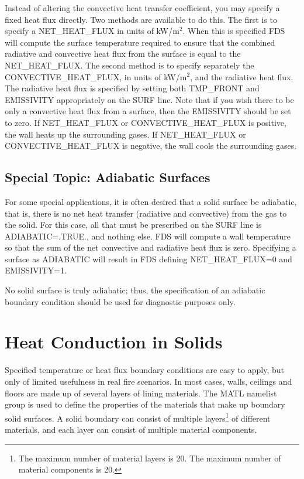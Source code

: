 \documentclass[11pt]{book}
\begin{document}
Instead of altering the convective heat transfer coefficient, you may specify a fixed heat flux directly.  Two methods are available to do this.  The first is to specify a {\ct NET\_HEAT\_FLUX} in units of kW/m$^2$.  When this is specified FDS will compute the surface temperature required to ensure that the combined radiative and convective heat flux from the surface is equal to the {\ct NET\_HEAT\_FLUX}.  The second method is to specify separately the {\ct CONVECTIVE\_HEAT\_FLUX}, in units of kW/m$^2$, and the radiative heat flux.  The radiative heat flux is specified  by setting both {\ct TMP\_FRONT} and {\ct EMISSIVITY} appropriately on the {\ct SURF} line. Note that if you wish there to be only a convective heat flux from a surface, then the {\ct EMISSIVITY} should be set to zero.  If {\ct NET\_HEAT\_FLUX} or {\ct CONVECTIVE\_HEAT\_FLUX} is positive, the wall heats up the surrounding gases. If {\ct NET\_HEAT\_FLUX} or {\ct CONVECTIVE\_HEAT\_FLUX} is negative, the wall cools the surrounding gases.



\subsection{Special Topic: Adiabatic Surfaces}
\label{info:adiabatic}

For some special applications, it is often desired that a solid surface be adiabatic, that is, there is no net heat transfer (radiative and convective) from the gas to the solid. For this case, all that must be prescribed on the {\ct SURF} line is {\ct ADIABATIC=.TRUE.}, and nothing else.  FDS will compute a wall temperature so that the sum of the net convective and radiative heat flux is zero.  Specifying a surface as {\ct ADIABATIC} will result in FDS defining {\ct NET\_HEAT\_FLUX=0} and {\ct EMISSIVITY=1}.

No solid surface is truly adiabatic; thus, the specification of an adiabatic boundary condition should be used for diagnostic purposes only.




\section{Heat Conduction in Solids}
\label{info:MATL}

Specified temperature or heat flux boundary conditions are easy to apply, but only of limited usefulness in real fire scenarios. In most cases, walls, ceilings and floors are made up of several layers of lining materials. The {\ct MATL} namelist group is used to define the properties of the materials that make up boundary solid surfaces. A solid boundary can consist of multiple layers\footnote{The maximum number of material layers is 20. The maximum number of material components is 20.} of different materials, and each layer can consist of multiple material components.
\end{document}
